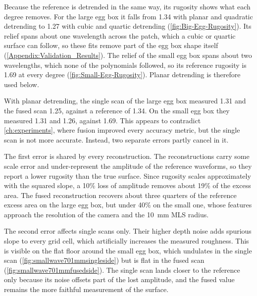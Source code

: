 Because the reference is detrended in the same way, its rugosity shows what each degree removes. For the large egg box it falls from 1.34 with planar and quadratic detrending to 1.27 with cubic and quartic detrending (\autoref{fig:Big-Egg-Rugosity}). Its relief spans about one wavelength across the patch, which a cubic or quartic surface can follow, so these fits remove part of the egg box shape itself (\autoref{Appendix:Validation_Results}). The relief of the small egg box spans about two wavelengths, which none of the polynomials followed, so its reference rugosity is 1.69 at every degree (\autoref{fig:Small-Egg-Rugosity}). Planar detrending is therefore used below.

With planar detrending, the single scan of the large egg box measured 1.31 and the fused scan 1.25, against a reference of 1.34. On the small egg box they measured 1.31 and 1.26, against 1.69. This appears to contradict \autoref{ch:experiments}, where fusion improved every accuracy metric, but the single scan is not more accurate. Instead, two separate errors partly cancel in it.

The first error is shared by every reconstruction. The reconstructions carry some scale error and under-represent the amplitude of the reference waveforms, so they report a lower rugosity than the true surface. Since rugosity scales approximately with the squared slope, a 10\% loss of amplitude removes about 19\% of the excess area. The fused reconstruction recovers about three quarters of the reference excess area on the large egg box, but under 40\% on the small one, whose features approach the resolution of the camera and the 10~mm MLS radius.

The second error affects single scans only. Their higher depth noise adds spurious slope to every grid cell, which artificially increases the measured roughness. This is visible on the flat floor around the small egg box, which undulates in the single scan (\autoref{fig:smallwave701mmsingleside}) but is flat in the fused scan (\autoref{fig:smallwave701mmfusedside}). The single scan lands closer to the reference only because its noise offsets part of the lost amplitude, and the fused value remains the more faithful measurement of the surface.





